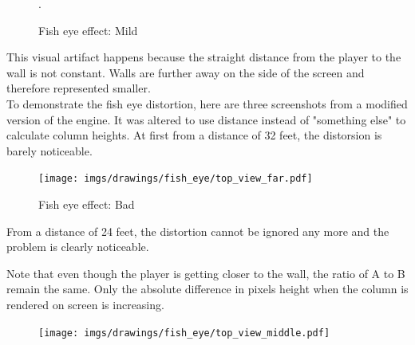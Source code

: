 \begin{minipage}{\textwidth}

    \begin{figure}[H]
    \centering
     \caption{Fish eye effect: Mild}. \label{fig:mips}
     \end{figure} 


    \begin{minipage}{.4\textwidth}
    This visual artifact happens because the straight distance from the player to the wall is not constant. Walls are further away on the side of the screen and therefore represented smaller.\\
    To demonstrate the fish eye distortion, here are three screenshots from a modified version of the engine. It was altered to use distance  instead of "something else" to calculate column heights. At first from a distance of 32 feet, the distorsion is barely noticeable.\\
     \end{minipage}
    \begin{minipage}{.6\textwidth}
    \begin{figure}[H]
      \begin{flushright}
     \texttt{[image: imgs/drawings/fish\_eye/top\_view\_far.pdf]}
       \end{flushright}
    \end{figure}
    \end{minipage}
\end{minipage}
\par



\begin{minipage}{\textwidth}
\begin{figure}[H]
\centering
 \caption{Fish eye effect: Bad} \label{fig:mips}
 \end{figure}
\begin{minipage}{.4\textwidth}
From a distance of 24 feet, the distortion cannot be ignored any more and the problem is clearly noticeable.\\
\par
Note that even though the player is getting closer to the wall, the ratio of A to B remain the same. Only the absolute difference in pixels height when the column is rendered on screen is increasing.
 \end{minipage}
\begin{minipage}{.6\textwidth}
\begin{figure}[H]
  \begin{flushright}
 \texttt{[image: imgs/drawings/fish\_eye/top\_view\_middle.pdf]}
 \end{flushright}
\end{figure}
\end{minipage}
\end{minipage}




